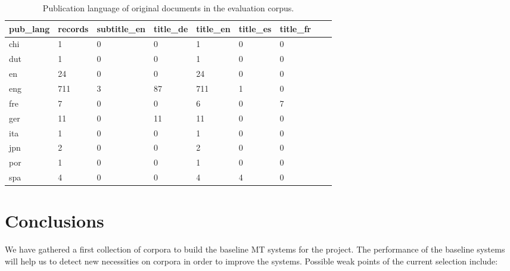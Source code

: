 \documentclass[a4paper,11pt]{article}
\begin{document}
\begin{small}
\begin{table}[]
\centering
\begin{tabular}{lllllllll}
\toprule
pub\_lang  & records  & subtitle\_en & title\_de & title\_en & title\_es & title\_fr &  \\
\midrule
chi                  & 1            & 0            & 0         & 1         & 0         & 0         &  \\
dut                   & 1            & 0            & 0         & 1         & 0         & 0         &  \\
en                   & 24           & 0            & 0         & 24        & 0         & 0         &  \\
eng               & 711          & 3            & 87        & 711       & 1         & 0         &  \\
fre                  & 7            & 0            & 0         & 6         & 0         & 7         &  \\
ger                  & 11           & 0            & 11        & 11        & 0         & 0         &  \\
ita                  & 1            & 0            & 0         & 1         & 0         & 0         &  \\
jpn                & 2            & 0            & 0         & 2         & 0         & 0         &  \\
por           & 1            & 0            & 0         & 1         & 0         & 0         &  \\
spa          & 4            & 0            & 0         & 4         & 4         & 0         &  \\
\bottomrule
\end{tabular}
\caption{Publication language of original documents in the evaluation corpus.}
\label{tab:publang}
\end{table}
\end{small}




\section{Conclusions}
\label{s:conclusions}

We have gathered a first collection of corpora to build the baseline MT systems for the project. The performance of the baseline systems will help us to detect new necessities on corpora in order to improve the systems. Possible weak points of the current selection include:
\end{document}
